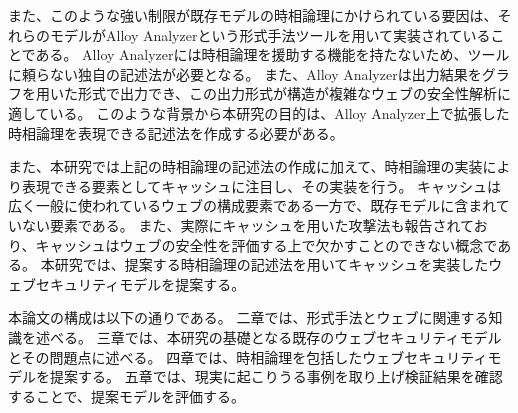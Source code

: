 \documentclass[12pt,a4paper]{jbook}
\begin{document}
また、このような強い制限が既存モデルの時相論理にかけられている要因は、それらのモデルがAlloy Analyzerという形式手法ツールを用いて実装されていることである。
Alloy Analyzerには時相論理を援助する機能を持たないため、ツールに頼らない独自の記述法が必要となる。
また、Alloy Analyzerは出力結果をグラフを用いた形式で出力でき、この出力形式が構造が複雑なウェブの安全性解析に適している。
このような背景から本研究の目的は、Alloy Analyzer上で拡張した時相論理を表現できる記述法を作成する必要がある。

また、本研究では上記の時相論理の記述法の作成に加えて、時相論理の実装により表現できる要素としてキャッシュに注目し、その実装を行う。
\color{black}
キャッシュは広く一般に使われているウェブの構成要素である一方で、既存モデルに含まれていない要素である。
また、実際にキャッシュを用いた攻撃法\cite{bcpattack}も報告されており、キャッシュはウェブの安全性を評価する上で欠かすことのできない概念である。
\color{red}
本研究では、提案する時相論理の記述法を用いてキャッシュを実装したウェブセキュリティモデルを提案する。
\color{black}

本論文の構成は以下の通りである。
二章では、形式手法とウェブに関連する知識を述べる。
三章では、本研究の基礎となる既存のウェブセキュリティモデルとその問題点に述べる。
四章では、時相論理を包括したウェブセキュリティモデルを提案する。
五章では、現実に起こりうる事例を取り上げ検証結果を確認することで、提案モデルを評価する。
\end{document}

